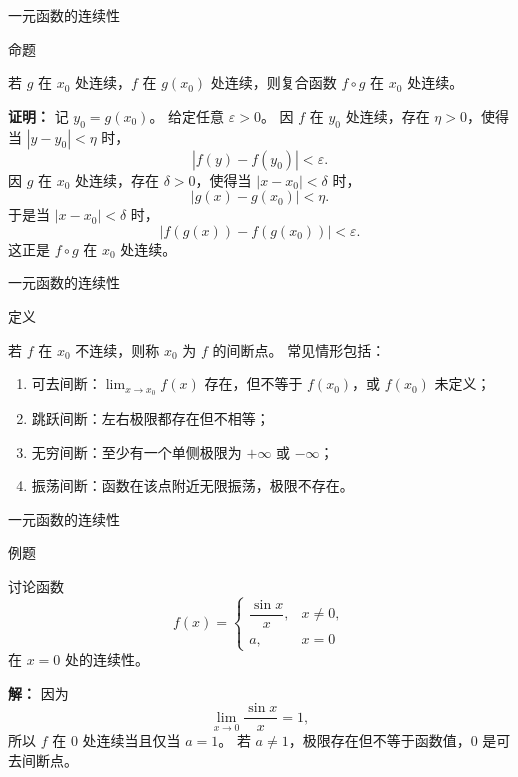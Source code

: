 \documentclass[aspectratio=169,10pt,fontset=fandol]{ctexbeamer}
\newenvironment{warning}{\par\noindent\textbf{注：}\quad}{\par\vspace{0.8em}}
\begin{document}
\begin{frame}[t,fragile]{一元函数的连续性}
\normalsize
\begin{block}{命题}
{\normalsize

若 $g$ 在 $x_0$ 处连续，$f$ 在 $g(x_0)$ 处连续，则复合函数 $f\circ g$ 在 $x_0$ 处连续。

}
\end{block}
\pause
{\normalsize
\textbf{证明：}
记 $y_0=g(x_0)$。 给定任意 $\varepsilon>0$。 因 $f$ 在 $y_0$ 处连续，存在 $\eta>0$，使得当 $|y-y_0|<\eta$ 时，
\[
|f(y)-f(y_0)|<\varepsilon.
\]
因 $g$ 在 $x_0$ 处连续，存在 $\delta>0$，使得当 $|x-x_0|<\delta$ 时，
\[
|g(x)-g(x_0)|<\eta.
\]
于是当 $|x-x_0|<\delta$ 时，
\[
|f(g(x))-f(g(x_0))|<\varepsilon.
\]
这正是 $f\circ g$ 在 $x_0$ 处连续。

}
\end{frame}
\begin{frame}[t,fragile]{一元函数的连续性}
\normalsize
\begin{block}{定义}
{\normalsize

若 $f$ 在 $x_0$ 不连续，则称 $x_0$ 为 $f$ 的间断点。 常见情形包括：
\begin{enumerate}[label=(\arabic*),leftmargin=2em]
\item 可去间断：$\lim_{x\to x_0}f(x)$ 存在，但不等于 $f(x_0)$，或 $f(x_0)$ 未定义；
\item 跳跃间断：左右极限都存在但不相等；
\item 无穷间断：至少有一个单侧极限为 \(+\infty\) 或 \(-\infty\)；
\item 振荡间断：函数在该点附近无限振荡，极限不存在。
\end{enumerate}

}
\end{block}
\end{frame}
\begin{frame}[t,fragile]{一元函数的连续性}
\normalsize
\begin{block}{例题}
{\normalsize
讨论函数
\[
f(x)=
\begin{cases}
\dfrac{\sin x}{x},&x\neq0,\\
a,&x=0
\end{cases}
\]
在 $x=0$ 处的连续性。

}
\end{block}
\pause
{\normalsize
\textbf{解：}
因为
\[
\lim_{x\to0}\frac{\sin x}{x}=1,
\]
所以 $f$ 在 $0$ 处连续当且仅当 $a=1$。 若 $a\neq1$，极限存在但不等于函数值，$0$ 是可去间断点。

}
\end{frame}
\end{document}
